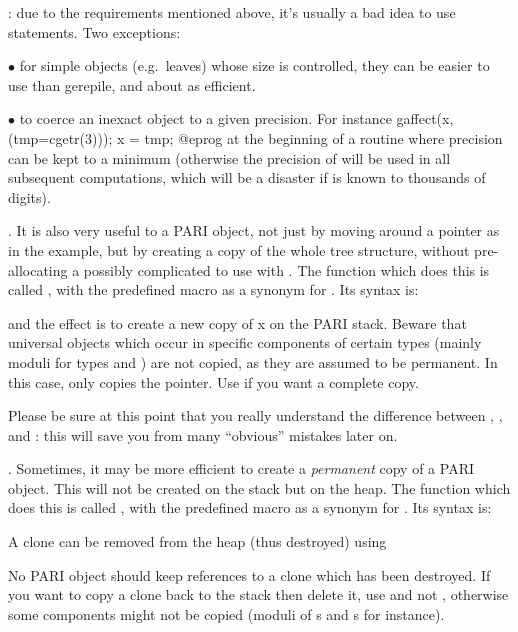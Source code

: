 
: due to the requirements mentioned above, it's usually
a bad idea to use  statements. Two exceptions:

$\bullet$ for simple objects (e.g.~leaves) whose size is controlled, they can
be easier to use than gerepile, and about as efficient.

$\bullet$ to coerce an inexact object to a given precision. For instance
\bprog
gaffect(x, (tmp=cgetr(3))); x = tmp;
@eprog
\noindent at the beginning of a routine where precision can be kept to a
minimum (otherwise the precision of  will be used in all subsequent
computations, which will be a disaster if  is known to thousands of
digits).

. It is also very useful to  a PARI object, not
just by moving around a pointer as in the  example, but by
creating a copy of the whole tree structure, without pre-allocating a
possibly complicated  to use with . The function which
does this is called , with the predefined macro
 as a synonym for . Its syntax is:


\noindent and the effect is to create a new copy of x on the PARI stack.
Beware that universal objects which occur in specific components of certain
types (mainly moduli for types  and ) are not
copied, as they are assumed to be permanent. In this case,  only
copies the pointer. Use  if you want a complete
copy.

Please be sure at this point that you really understand the difference between
, , and : this will save you
from many ``obvious'' mistakes later on.

.
Sometimes, it may be more efficient to create a \emph{permanent} copy of a
PARI object. This will not be created on the stack but on the heap. The
function which does this is called , with the predefined macro
 as a synonym for . Its syntax is:


A clone can be removed from the heap (thus destroyed) using


\noindent No PARI object should keep references to a clone which has been
destroyed. If you want to copy a clone back to the stack then delete it, use
 and not , otherwise some components might not be
copied (moduli of s and s for instance).

